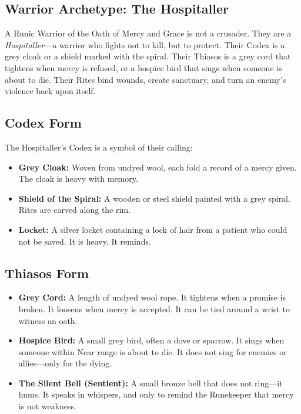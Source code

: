 \subsection{Warrior Archetype: The Hospitaller}

A Runic Warrior of the Oath of Mercy and Grace is not a crusader. They are a \textit{Hospitaller}—a warrior who fights not to kill, but to protect. Their Codex is a grey cloak or a shield marked with the spiral. Their Thiasos is a grey cord that tightens when mercy is refused, or a hospice bird that sings when someone is about to die. Their Rites bind wounds, create sanctuary, and turn an enemy's violence back upon itself.

\subsection{Codex Form}

The Hospitaller's Codex is a symbol of their calling:

\begin{itemize}
\item \textbf{Grey Cloak:} Woven from undyed wool, each fold a record of a mercy given. The cloak is heavy with memory.
\item \textbf{Shield of the Spiral:} A wooden or steel shield painted with a grey spiral. Rites are carved along the rim.
\item \textbf{Locket:} A silver locket containing a lock of hair from a patient who could not be saved. It is heavy. It reminds.
\end{itemize}

\subsection{Thiasos Form}

\begin{itemize}
\item \textbf{Grey Cord:} A length of undyed wool rope. It tightens when a promise is broken. It loosens when mercy is accepted. It can be tied around a wrist to witness an oath.
\item \textbf{Hospice Bird:} A small grey bird, often a dove or sparrow. It sings when someone within Near range is about to die. It does not sing for enemies or allies—only for the dying.
\item \textbf{The Silent Bell (Sentient):} A small bronze bell that does not ring—it hums. It speaks in whispers, and only to remind the Runekeeper that mercy is not weakness.
\end{itemize}

